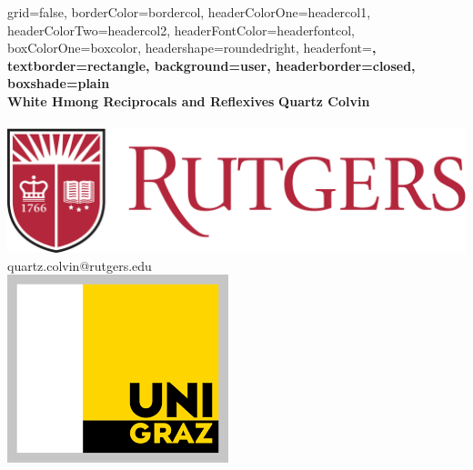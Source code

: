 \documentclass[a0paper,landscape,columns=2]{../includes/tex/baposter}
\begin{document}
\begin{poster}{
  grid=false,
  borderColor=bordercol,         %
  headerColorOne=headercol1,     %
  headerColorTwo=headercol2,     %
  headerFontColor=headerfontcol, %
  boxColorOne=boxcolor,          %
  headershape=roundedright,      %
  headerfont=\Large\sf\bf,       %
  textborder=rectangle,
  background=user,
  headerborder=closed,           %
  boxshade=plain
}
{}
%
%
{
 \sf\bf 
 \phantom{.} \\ 
 \vspace{0.4in}
 \LARGE{White Hmong Reciprocals and Reflexives}}
{
 \vspace{.4em} 
 \textbf{Quartz Colvin} \\ 
  \\
 {\vspace{-0.4in}\hspace{-10.40in}
  \includegraphics[scale=0.3]{../includes/figs/ru_shield2}\phantom{.}} \\
 {\vspace{-0.20in}\smaller quartz.colvin@rutgers.edu} \\
 {\vspace{-0.9in}\hspace{11.05in}
   \includegraphics[scale=0.3]{../includes/figs/uni-graz.png}\phantom{.}}
}




\end{poster}
\end{document}

